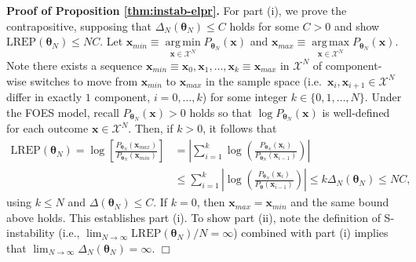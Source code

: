 \documentclass[numbib]{imamat}
\theoremstyle{theorem}
\theoremstyle{lemma}
\theoremstyle{example}
\theoremstyle{corollary}
\theoremstyle{definition}
\theoremstyle{remark}
\theoremstyle{approximation}
\theoremstyle{scheme}
\DeclareMathOperator*{\argmin}{arg\,min}
\DeclareMathOperator*{\argmax}{arg\,max}
\newcommand{\REP}{\mathrm{LREP}}
\newcommand{\DN}{\Delta_N}
\begin{document}
\textbf{Proof of Proposition \ref{thm:instab-elpr}.} For part (i), we prove the contrapositive, supposing that \(\DN(\boldsymbol \theta_N) \le C\) holds for some \(C > 0\) and show \(\REP(\boldsymbol \theta_N) \leq NC\). Let \(\boldsymbol x_{min} \equiv \argmin\limits_{\boldsymbol x \in \mathcal{X}^N}P_{\boldsymbol \theta_N}(\boldsymbol x)\)
and \(\boldsymbol x_{max} \equiv \argmax\limits_{\boldsymbol x \in \mathcal{X}^N}P_{\boldsymbol \theta_N}(\boldsymbol x)\). Note there exists a sequence \(\boldsymbol x_{min} \equiv \boldsymbol x_0, \boldsymbol x_1, \dots, \boldsymbol x_k \equiv \boldsymbol x_{max}\) in \(\mathcal{X}^N\) of component-wise switches to move from \(\boldsymbol x_{min}\) to \(\boldsymbol x_{max}\) in the sample space (i.e.~\(\boldsymbol x_i, \boldsymbol x_{i + 1} \in \mathcal{X}^N\) differ in exactly \(1\) component, \(i = 0, \dots, k\)) for some integer \(k \in \{0, 1, \dots, N\}\). Under the FOES model, recall
\(P_{\boldsymbol \theta_N}(\boldsymbol x) > 0\) holds so that \(\log P_{\boldsymbol \theta_N}(\boldsymbol x)\) is well-defined for each outcome \(\boldsymbol x \in \mathcal{X}^N\). Then, if \(k > 0\), it follows that
\begin{align*}
\REP(\boldsymbol \theta_N) = \log\left[\frac{P_{\boldsymbol \theta_N}(\boldsymbol x_{max})}{P_{\boldsymbol \theta_N}(\boldsymbol x_{min})}\right] &= \left|\sum\limits_{i = 1}^k\log\left(\frac{P_{\boldsymbol \theta_N}(\boldsymbol x_i)}{P_{\boldsymbol \theta_N}(\boldsymbol x_{i-1})}\right)\right| \\
&\le \sum\limits_{i = 1}^k\left|\log\left(\frac{P_{\boldsymbol \theta_N}(\boldsymbol x_i)}{P_{\boldsymbol \theta}(\boldsymbol x_{i-1})}\right)\right| \le k \Delta_N(\boldsymbol \theta_N) \le NC,
\end{align*}
using \(k \le N\) and \(\Delta(\boldsymbol \theta_N) \le C\). If \(k = 0\), then \(\boldsymbol x_{max} = \boldsymbol x_{min}\) and the same bound above holds. This establishes part (i). To show part (ii), note the definition of S-instability (i.e., \(\lim_{N\to \infty}\REP(\boldsymbol \theta_N)/N= \infty\)) combined with part (i) implies that \(\lim_{N\to \infty}\DN(\boldsymbol \theta_N)=\infty\). \hfill \(\Box\)
\end{document}
